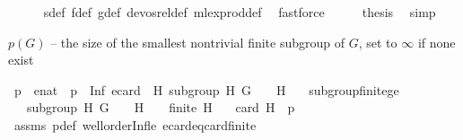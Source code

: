 \begin{isabellebody}
\ \ \ \ \isamarkupfalse%
\ s{\isacharunderscore}{\kern0pt}def\ f{\isacharunderscore}{\kern0pt}def\ g{\isacharunderscore}{\kern0pt}def\ devos{\isacharunderscore}{\kern0pt}rel{\isacharunderscore}{\kern0pt}def\ mlex{\isacharunderscore}{\kern0pt}prod{\isacharunderscore}{\kern0pt}def\ \isamarkupfalse%
\ fastforce\isanewline
\ \ \isamarkupfalse%
\ \isamarkupfalse%
\ {\isacharquery}{\kern0pt}thesis\ \isamarkupfalse%
\ simp\isanewline
{}\isamarkupfalse%
%
\endisatagproof
{\isafoldproof}%
%
\isadelimproof
%
\endisadelimproof
%
\isadelimdocument
%
\endisadelimdocument
%
\isatagdocument
%
\isamarkuptrue%
%
\endisatagdocument
{\isafolddocument}%
%
\isadelimdocument
%
\endisadelimdocument
%
\begin{isamarkuptext}%
$p(G)$ -- the size of the smallest nontrivial finite subgroup of $G$, set to $\infty$ if none exist%
\end{isamarkuptext}\isamarkuptrue%
\isamarkupfalse%
\ p\ {\isacharcolon}{\kern0pt}{\isacharcolon}{\kern0pt}\ enat\ \ {\isachardoublequoteopen}p\ {\isacharequal}{\kern0pt}\ Inf\ {\isacharparenleft}{\kern0pt}ecard\ {\isacharbackquote}{\kern0pt}\ {\isacharbraceleft}{\kern0pt}H{\isachardot}{\kern0pt}\ subgroup\ H\ G\ {\isacharparenleft}{\kern0pt}{\isasymcdot}{\isacharparenright}{\kern0pt}\ {\isasymone}\ {\isasymand}\ H\ {\isasymnoteq}\ {\isacharbraceleft}{\kern0pt}{\isasymone}{\isacharbraceright}{\kern0pt}{\isacharbraceright}{\kern0pt}{\isacharparenright}{\kern0pt}{\isachardoublequoteclose}\isanewline
\isanewline
{}\isamarkupfalse%
\ subgroup{\isacharunderscore}{\kern0pt}finite{\isacharunderscore}{\kern0pt}ge{\isacharcolon}{\kern0pt}\isanewline
\ \ \ {\isachardoublequoteopen}subgroup\ H\ G\ {\isacharparenleft}{\kern0pt}{\isasymcdot}{\isacharparenright}{\kern0pt}\ {\isasymone}{\isachardoublequoteclose}\ \ {\isachardoublequoteopen}H\ {\isasymnoteq}\ {\isacharbraceleft}{\kern0pt}{\isasymone}{\isacharbraceright}{\kern0pt}{\isachardoublequoteclose}\ \ {\isachardoublequoteopen}finite\ H{\isachardoublequoteclose}\isanewline
\ \ \ {\isachardoublequoteopen}card\ H\ {\isasymge}\ p{\isachardoublequoteclose}\isanewline
%
\isadelimproof
\ \ %
\endisadelimproof
%
\isatagproof
{}\isamarkupfalse%
\ assms\ p{\isacharunderscore}{\kern0pt}def\ wellorder{\isacharunderscore}{\kern0pt}Inf{\isacharunderscore}{\kern0pt}le{}\ ecard{\isacharunderscore}{\kern0pt}eq{\isacharunderscore}{\kern0pt}card{\isacharunderscore}{\kern0pt}finite\isanewline

\end{isabellebody}
